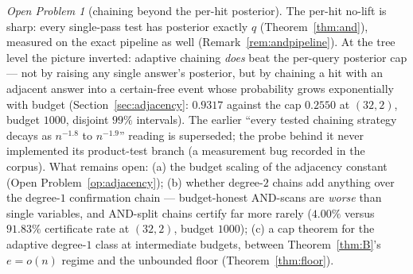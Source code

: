 \documentclass[11pt]{article}
\theoremstyle{definition}
\theoremstyle{remark}
\newtheorem{openproblem}{Open Problem}
\begin{document}
\begin{openproblem}[chaining beyond the per-hit posterior]
\label{op:chaining}
The per-hit no-lift is sharp: every single-pass test has posterior
exactly $q$ (Theorem~\ref{thm:and}), measured on the exact pipeline as
well (Remark~\ref{rem:andpipeline}).  At the tree level the picture
inverted: adaptive chaining \emph{does} beat the per-query posterior
cap --- not by raising any single answer's posterior, but by chaining
a hit with an adjacent answer into a certain-free event whose
probability grows exponentially with budget (Section~\ref{sec:adjacency}:
$0.9317$ against the cap $0.2550$ at $(32,2)$, budget $1000$, disjoint
$99\%$ intervals).  The earlier ``every tested chaining strategy decays
as $n^{-1.8}$ to $n^{-1.9}$'' reading is superseded; the probe behind
it never implemented its product-test branch (a measurement bug
recorded in the corpus).  What remains open: (a) the budget scaling of
the adjacency constant (Open Problem~\ref{op:adjacency}); (b) whether
degree-$2$ chains add anything over the degree-$1$ confirmation chain
--- budget-honest AND-scans are \emph{worse} than single variables,
and AND-split chains certify far more rarely ($4.00\%$ versus
$91.83\%$ certificate rate at $(32,2)$, budget $1000$); (c) a cap
theorem for the adaptive degree-$1$ class at intermediate budgets,
between Theorem~\ref{thm:B}'s $e=o(n)$ regime and the unbounded floor
(Theorem~\ref{thm:floor}).
\end{openproblem}
\end{document}

